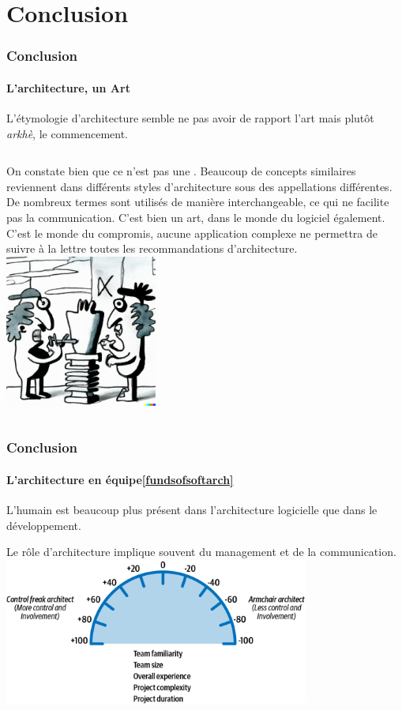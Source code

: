 \documentclass{beamer}
\begin{document}
    \section{Conclusion}\label{sec:conclusion}

    \begin{frame}
        \transdissolve
        \frametitle{Conclusion}
        \framesubtitle{L'architecture, un Art}
        L'étymologie d'architecture semble ne pas avoir de rapport l'art mais plutôt \textit{arkhè}, le commencement.
        \begin{columns}
            \bigbreak
            On constate bien que ce n'est pas une .
            Beaucoup de concepts similaires reviennent dans différents styles d'architecture sous des appellations différentes.
            De nombreux termes sont utilisés de manière interchangeable, ce qui ne facilite pas la communication.
            C'est bien un art, dans le monde du logiciel également.
            \bigbreak
            C'est le monde du compromis, aucune application complexe ne permettra de suivre à la lettre toutes les recommandations d'architecture.
            \centering
            \includegraphics[width=5cm]{image/two-artists-arguing}
        \end{columns}
    \end{frame}

    \begin{frame}
        \transdissolve
        \frametitle{Conclusion}
        \framesubtitle{L'architecture en équipe\cref{fundsofsoftarch}}
        L'humain est beaucoup plus présent dans l'architecture logicielle que dans le développement.

        Le rôle d'architecture implique souvent du management et de la communication.
        \bigbreak
        \centering
        \includegraphics[width=10cm]{image/efficient-team}
    \end{frame}
\end{document}
